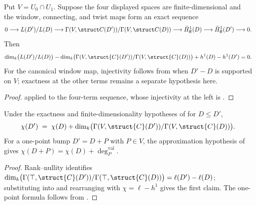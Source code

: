 \begin{theorem}
  \label{thm:adelic_ledger_alternating}
  \leanok
  Put \(V=U_0\cap U_1\).  Suppose the four displayed spaces are
  finite-dimensional and the window, connecting, and twist maps form an
  exact sequence
  \[
    0\longrightarrow L(D')/L(D)
      \longrightarrow \Gamma(V,\struct C(D'))/\Gamma(V,\struct C(D))
      \longrightarrow\check H^1_{\mathrm{ff}}(D)
      \longrightarrow\check H^1_{\mathrm{ff}}(D')\longrightarrow0.
  \]
  Then
  \[
    \dim_k\bigl(L(D')/L(D)\bigr) - \dim_k\bigl(\Gamma(V,\struct{C}(D'))/
      \Gamma(V,\struct{C}(D))\bigr) + h^1(D) - h^1(D') = 0.
  \]
  For the canonical window map, injectivity follows from
   when \(D'-D\) is supported on
  \(V\); exactness at the other terms remains a separate hypothesis here.
\end{theorem}
\begin{proof}
  \leanok
   applied to the four-term
  sequence, whose injectivity at the left is
  .
\end{proof}

\begin{theorem}
  \label{thm:adelic_chi_additivity}
  \leanok
  Under the exactness and finite-dimensionality hypotheses of
   for \(D\le D'\),
  \[
    \chi(D') \;=\; \chi(D) + \dim_k\bigl(\Gamma(V,\struct{C}(D'))/
      \Gamma(V,\struct{C}(D))\bigr).
  \]
  For a one-point bump \(D'=D+P\) with \(P\in V\), the approximation hypothesis of
   gives
  \(\chi(D+P)=\chi(D)+\deg_P^{\mathrm{val}}\).
\end{theorem}
\begin{proof}
  \leanok
  Rank--nullity identifies
  \(\dim_k\bigl(\Gamma(\top,\struct{C}(D'))/\Gamma(\top,\struct{C}(D))\bigr)
  = \ell(D') - \ell(D)\); substituting into
   and rearranging with
  \(\chi = \ell - h^1\) gives the first claim.  The one-point formula
  follows from .
\end{proof}

